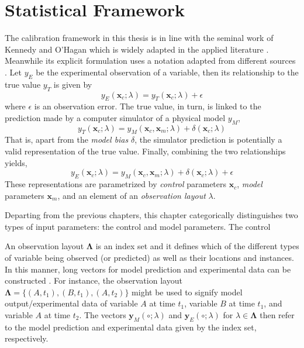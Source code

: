 \section{Statistical Framework}\label{sec:bc_statistical_framework}

The calibration framework in this thesis is in line with the seminal work of Kennedy and O'Hagan \cite{Kennedy2001} which is widely adapted in the applied literature \cite{Bayarri2007,Higdon2008,Arendt2012,Reichert2012}.
Meanwhile its explicit formulation uses a notation adapted from different sources \cite{Kennedy2001,Santner2003,Reichert2012}.
Let $y_E$ be the experimental observation of a variable,
then its relationship to the true value $y_T$ is given by
\begin{equation}
    y_E(\bm{x}_c; \lambda) = y_T (\bm{x}_c; \lambda) + \epsilon
\label{eq:bc_observation_true}
\end{equation}
where $\epsilon$ is an observation error.
The true value, in turn, is linked to the prediction made by a computer simulator of a physical model $y_M$,
\begin{equation}
    y_T(\bm{x}_c; \lambda) = y_M (\bm{x}_c, \bm{x}_m; \lambda) + \delta (\bm{x}_c; \lambda)
\label{eq:bc_true_simulation}
\end{equation}
That is, apart from the \emph{model bias} $\delta$, the simulator prediction is potentially a valid representation of the true value.
Finally, combining the two relationships yields,
\begin{equation}
    y_E(\bm{x}_c; \lambda) = y_M (\bm{x}_c, \bm{x}_m; \lambda) + \delta (\bm{x}_c; \lambda) + \epsilon
\label{eq:bc_observation_true}
\end{equation}
These representations are parametrized by \emph{control} parameters $\bm{x}_c$,
\emph{model} parameters $\bm{x}_m$, and an element of an \emph{observation layout} $\lambda$.

Departing from the previous chapters, this chapter categorically distinguishes two types of input parameters: the control and model parameters.
The control 

An observation layout $\boldsymbol{\Lambda}$ is an index set and it defines which of the different types of variable being observed (or predicted) as well as their locations and instances.
In this manner, long vectors for model prediction and experimental data can be constructed \cite{Reichert2012}.
For instance, the observation layout $\boldsymbol{\Lambda} = \{(A,t_1), (B,t_1), (A, t_2)\}$ might be used to signify model output/experimental data of variable $A$ at time $t_1$, variable $B$ at time $t_1$, and variable $A$ at time $t_2$.
The vectors $\bm{y}_M(\circ;\lambda)$ and $\bm{y}_E(\circ;\lambda)$ for $\lambda \in \boldsymbol{\Lambda}$ then refer to the model prediction and experimental data given by the index set, respectively.

